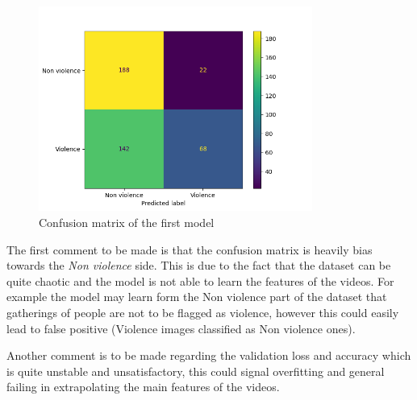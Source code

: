 \begin{figure}[]
    \centering
    \includegraphics[width=0.8\textwidth]{images/731a-2D3-86ad-conf_matrix.png}
    \caption{Confusion matrix of the first model}
    \label{fig:First2DCNNConfusionMatrix}
\end{figure}


The first comment to be made is that the confusion matrix is heavily bias towards the \textit{Non violence} side. This is due to the fact that the dataset can be quite chaotic and the model is not able to learn the features of the videos. For example the model may learn form the Non violence part of the dataset that gatherings of people are not to be flagged as violence, however this could easily lead to false positive (Violence images classified as Non violence ones).

Another comment is to be made regarding the validation loss and accuracy which is quite unstable and unsatisfactory, this could signal overfitting and general failing in extrapolating the main features of the videos.
\pagebreak
